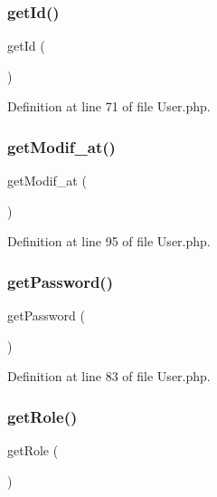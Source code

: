 \subsubsection{get\+Id()}
{\footnotesize\ttfamily get\+Id (\begin{DoxyParamCaption}{ }\end{DoxyParamCaption})}



Definition at line 71 of file User.\+php.

\mbox{\label{class_src_1_1_entity_1_1_user_a5858386cc69be9863ed37e0ceb2697b1}} 
\subsubsection{get\+Modif\+\_\+at()}
{\footnotesize\ttfamily get\+Modif\+\_\+at (\begin{DoxyParamCaption}{ }\end{DoxyParamCaption})}



Definition at line 95 of file User.\+php.

\mbox{\label{class_src_1_1_entity_1_1_user_a04e0957baeb7acde9c0c86556da2d43f}} 
\subsubsection{get\+Password()}
{\footnotesize\ttfamily get\+Password (\begin{DoxyParamCaption}{ }\end{DoxyParamCaption})}



Definition at line 83 of file User.\+php.

\mbox{\label{class_src_1_1_entity_1_1_user_a0b2e7098f1c48a7439a42bada5b69689}} 
\subsubsection{get\+Role()}
{\footnotesize\ttfamily get\+Role (\begin{DoxyParamCaption}{ }\end{DoxyParamCaption})}



